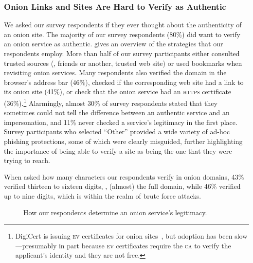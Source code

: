 \subsubsection{Onion Links and Sites Are Hard to Verify as Authentic}
We asked our survey respondents if they ever thought about the authenticity of an onion
site.  The majority of our survey respondents (80\%) did want to verify an onion service as authentic.   gives an overview of the
strategies that our respondents employ.  More than half of our survey participants either consulted trusted
sources (\eg, friends or another, trusted web site) or used bookmarks when
revisiting onion services.  Many respondents also verified the domain in the
browser's address bar (46\%), checked if the corresponding web site had a link to
its onion site (41\%), or check that the onion service had an \textsc{https}
certificate (36\%).\footnote{DigiCert is issuing \textsc{ev} certificates for
onion sites~\cite{DigiCert2015a}, but adoption has been slow---presumably in part
because \textsc{ev} certificates require the \textsc{ca} to verify the
applicant's identity and they are not free.}  Alarmingly, almost 30\% of
survey respondents stated that they sometimes could not tell the difference between an
authentic service and an impersonation, and 11\% never checked a service's
legitimacy in the first place.  Survey participants who selected ``Other'' provided a wide
variety of ad-hoc phishing protections, some of which were clearly misguided, 
further highlighting the importance of being able to verify a site as being the one that they were trying to reach.

When asked how many characters our respondents verify in
onion domains,  43\% verified thirteen to sixteen digits, \ie, (almost) the full
domain, while 46\% verified up to nine digits, which is within the realm of brute
force attacks.

\begin{figure}[t]
    \centering
    
    \caption{How our respondents determine an onion service's legitimacy.}
    \label{fig:determining-legitimacy}
\end{figure}


